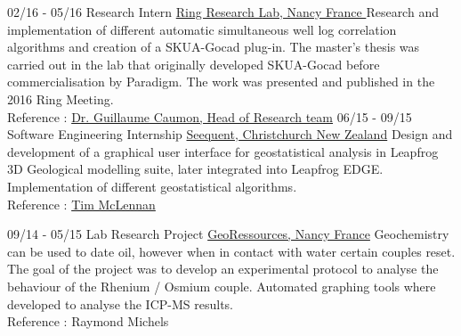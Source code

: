 \documentclass[]{friggeri-cv}
\begin{document}
    \vspace*{\fill}
    \begin{entrylist}
    \entry
    {02/16 - 05/16}
    {Research Intern}
    {\href{http://www.ring-team.org/}{Ring Research Lab, Nancy France }}
    {Research and implementation of different automatic simultaneous well log correlation algorithms and creation of a SKUA-Gocad plug-in. The master's thesis was carried out in the lab that originally developed SKUA-Gocad before commercialisation by Paradigm. The work was presented and published in the 2016 Ring Meeting. \\Reference : \href{mailto:Guillaume.Caumon@ensg.univ-lorraine.fr}{Dr. Guillaume Caumon, Head of Research team}}
    \entry
    {06/15 - 09/15}
    {Software Engineering Internship}
    {\href{https://www.seequent.com/}{Seequent, Christchurch New Zealand}}
    {Design and development of a graphical user interface for geostatistical analysis in Leapfrog 3D Geological modelling suite, later integrated into Leapfrog EDGE. Implementation of different geostatistical algorithms.
    \\
    Reference : \href{mailto:tim.mclennan@seequent.com}{Tim McLennan}}

	\entry
	{09/14 - 05/15}
	{Lab Research Project}
	{\href{http://georessources.univ-lorraine.fr/}{GeoRessources, Nancy France}}
	{Geochemistry can be used to date oil, however when in contact with water certain couples reset. The goal of the project was to develop an experimental protocol to analyse the behaviour of the Rhenium / Osmium couple. Automated graphing tools where developed to analyse the ICP-MS results.
		\\
		Reference : Raymond Michels}
\end{entrylist}
\end{document}
